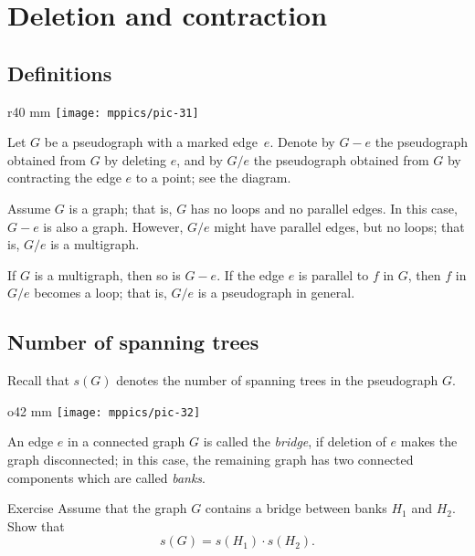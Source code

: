 \chapter{Deletion and contraction}
\label{Deletion and contraction}

\section*{Definitions}


\begin{wrapfigure}{r}{40 mm}
\vskip-12mm
\centering
\texttt{[image: mppics/pic-31]}
\vskip-0mm
\end{wrapfigure}

Let $G$ be a pseudograph with a marked edge~$e$.
Denote by $G- e$ the pseudograph obtained from $G$ by deleting $e$,
and by $G/e$ the pseudograph obtained from $G$ by contracting the edge $e$ to a point; see the diagram.

Assume $G$ is a graph; that is, $G$ has no loops and no parallel edges.
In this case, $G- e$ is also a graph.
However, $G/e$ might have parallel edges, but no loops; that is, $G/e$ is a multigraph.

If $G$ is a multigraph, then so is $G- e$.
If the edge $e$ is parallel to $f$ in $G$, then $f$ in $G/e$ becomes a loop; that is, $G/e$ is a pseudograph in general.


\section*{Number of spanning trees}

Recall that $s(G)$ denotes the number of spanning trees in the pseudograph $G$.

{
\begin{wrapfigure}{o}{42 mm}
\vskip-4mm
\centering
\texttt{[image: mppics/pic-32]}
\vskip-0mm
\end{wrapfigure}

An edge $e$ in a connected graph $G$ is called the \emph{bridge}, if deletion of $e$ makes the graph disconnected;
in this case, the remaining graph has two connected components which are called {}\emph{banks}.


\begin{thm}{Exercise}
Assume that the graph $G$ contains a bridge between banks $H_1$ and $H_2$.
Show that
\[s(G)=s(H_1)\cdot s(H_2).\]
\end{thm}

}


